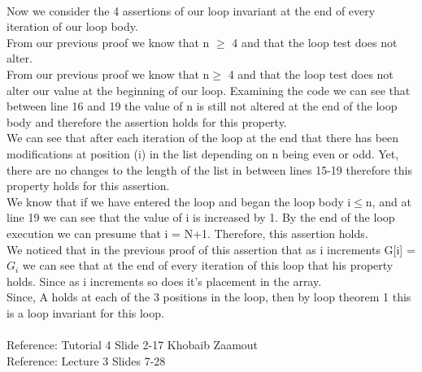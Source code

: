 \documentclass{article}
\begin{document}
    \\Now we consider the 4 assertions of our loop invariant at the end of every iteration of our loop body.\\
    From our previous proof we know that n $\geq$ 4 and that the loop test does not alter.\\
    From our previous proof we know that n$\geq$ 4 and that the loop test does not alter our value at the beginning of our loop. Examining the code we can see that between line 16 and 19 the value of n is still not altered at the end of the loop body and therefore the assertion holds for this property. \\
    We can see that after each iteration of the loop at the end that there has been modifications at position (i) in the list depending on n being even or odd. Yet, there are no changes to the length of the list in between lines 15-19 therefore this property holds for this assertion. \\
    We know that if we have entered the loop and began the loop body i$\leq$n, and at line 19 we can see that the value of i is increased by 1. By the end of the loop execution we can presume that i = N+1. Therefore, this assertion holds.\\
    We noticed that in the previous proof of this assertion that as i increments G[i] = $G_{i}$ we can see that at the end of every iteration of this loop that his property holds. Since as i increments so does it’s placement in the array.\\
    Since, A holds at each of the 3 positions in the loop, then by loop theorem 1 this is a loop invariant for this loop.
    \\
    \\Reference: Tutorial 4 Slide 2-17 Khobaib Zaamout
    \\Reference: Lecture 3 Slides 7-28
    \\
\end{document}
